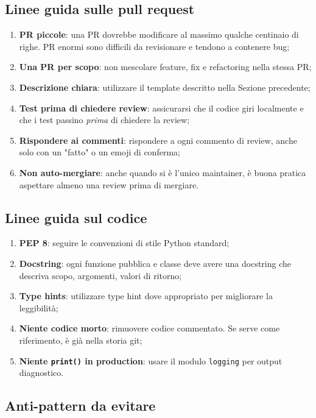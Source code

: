 \subsection{Linee guida sulle pull request}

\begin{enumerate}
  \item \textbf{PR piccole}: una PR dovrebbe modificare al massimo qualche centinaio di righe. PR enormi sono difficili da revisionare e tendono a contenere bug;
  \item \textbf{Una PR per scopo}: non mescolare feature, fix e refactoring nella stessa PR;
  \item \textbf{Descrizione chiara}: utilizzare il template descritto nella Sezione precedente;
  \item \textbf{Test prima di chiedere review}: assicurarsi che il codice giri localmente e che i test passino \emph{prima} di chiedere la review;
  \item \textbf{Rispondere ai commenti}: rispondere a ogni commento di review, anche solo con un "fatto" o un emoji di conferma;
  \item \textbf{Non auto-mergiare}: anche quando si è l'unico maintainer, è buona pratica aspettare almeno una review prima di mergiare.
\end{enumerate}

\subsection{Linee guida sul codice}

\begin{enumerate}
  \item \textbf{PEP 8}: seguire le convenzioni di stile Python standard;
  \item \textbf{Docstring}: ogni funzione pubblica e classe deve avere una docstring che descriva scopo, argomenti, valori di ritorno;
  \item \textbf{Type hints}: utilizzare type hint dove appropriato per migliorare la leggibilità;
  \item \textbf{Niente codice morto}: rimuovere codice commentato. Se serve come riferimento, è già nella storia git;
  \item \textbf{Niente \texttt{print()} in production}: usare il modulo \texttt{logging} per output diagnostico.
\end{enumerate}

\subsection{Anti-pattern da evitare}

